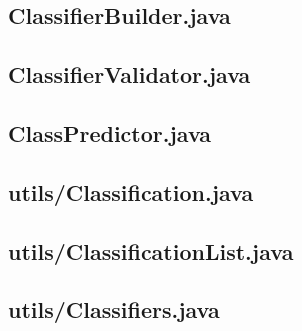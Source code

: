 \documentclass{article}
\begin{document}
\begin{appendices}
\begin{subappendices}
        \pagebreak
        \subsection{ClassifierBuilder.java}
        \label{src:pulsarclassifier:builder}
        

        \pagebreak
        \subsection{ClassifierValidator.java}
        \label{src:pulsarclassifier:validator}
        

        \pagebreak
        \subsection{ClassPredictor.java}
        \label{src:pulsarclassifier:predictor}
        

        \pagebreak
        \subsection{utils/Classification.java}
        

        \pagebreak
        \subsection{utils/ClassificationList.java}
        

        \pagebreak
        \subsection{utils/Classifiers.java}
        


\end{subappendices}
\end{appendices}
\end{document}
